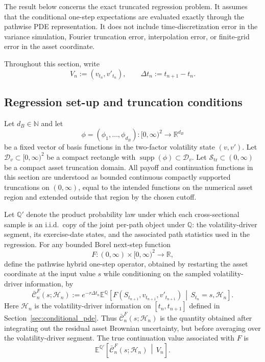 \documentclass[pdflatex,sn-mathphys-num]{sn-jnl}
\theoremstyle{thmstyleone}%
\theoremstyle{thmstylethree}%
\theoremstyle{thmstyletwo}%
\newcommand{\E}{\mathbb E}
\newcommand{\Q}{\mathbb Q}
\newcommand{\R}{\mathbb R}
\providecommand{\supp}{\operatorname{supp}}
\begin{document}
The result below concerns the exact truncated regression problem. It assumes
that the conditional one-step expectations are evaluated exactly through the
pathwise PDE representation. It does not include time-discretization error in
the variance simulation, Fourier truncation error, interpolation error, or
finite-grid error in the asset coordinate.

Throughout this section, write
\[
    V_n:=(v_{t_n},v'_{t_n}),
    \qquad
    \Delta t_n:=t_{n+1}-t_n .
\]

\subsection{Regression set-up and truncation conditions}
\label{subsec:regression_truncation}

Let $d_B\in\mathbb{N}$ and let
\[
    \phi = (\phi_1,\dots,\phi_{d_B})
    : [0,\infty)^2 \to \R^{d_B}
\]
be a fixed vector of basis functions in the two-factor volatility state $(v,v')$.
Let $\mathcal D_v\subset [0,\infty)^2$ be a compact rectangle with
$\supp(\phi)\subset \mathcal D_v$. Let
$\mathcal S_{\mathrm{tr}}\subset(0,\infty)$ be a compact asset truncation
domain. All payoff and continuation functions in this section are understood as
bounded continuous compactly supported truncations on $(0,\infty)$, equal to the
intended functions on the numerical asset region and extended outside that
region by the chosen cutoff.

Let $\Q'$ denote the product probability law under which each cross-sectional
sample is an i.i.d.\ copy of the joint per-path object under $\Q$: the
volatility-driver segment, its exercise-date states, and the associated path
statistics used in the regression. For any bounded Borel next-step function
\[
    F:(0,\infty)\times[0,\infty)^2\to\R,
\]
define the pathwise hybrid one-step operator, obtained by restarting the asset
coordinate at the input value $s$ while conditioning on the sampled
volatility-driver information, by
\[
    \bar{\mathcal C}_n^{F}(s;\mathcal H_n)
    :=
    e^{-r\Delta t_n}
    \E^{\Q}\!\left[
        F(S_{t_{n+1}},v_{t_{n+1}},v'_{t_{n+1}})
        \,\middle|\,
        S_{t_n}=s,\mathcal H_n
    \right].
\]
Here $\mathcal H_n$ is the volatility-driver information on
$[t_n,t_{n+1}]$ defined in Section~\ref{sec:conditional_pde}. Thus
$\bar{\mathcal C}_n^{F}(s;\mathcal H_n)$ is the quantity obtained after
integrating out the residual asset Brownian uncertainty, but before averaging
over the volatility-driver segment. The true continuation value associated with
$F$ is
\[
    \E^{\Q'}\!\left[
        \bar{\mathcal C}_n^{F}(s;\mathcal H_n)
        \,\middle|\,
        V_n
    \right].
\]
\end{document}
